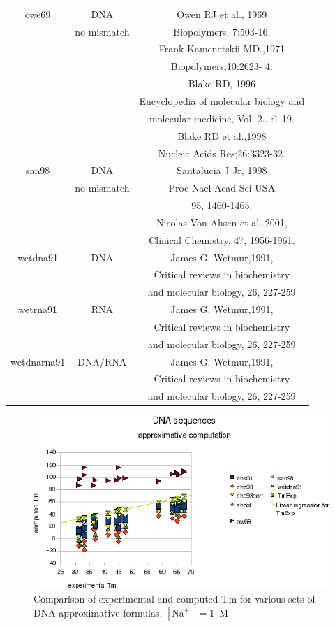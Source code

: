 \documentclass{article}
\begin{document}
\begin{table}[hc]
\begin{tabular}[h]{| c | c | c |}
 \hline
owe69 & DNA & Owen RJ et al., 1969\\
 & no mismatch & Biopolymers, 7:503-16. \\
 & & Frank-Kamenetskii MD.,1971 \\
 & & Biopolymers;10:2623- 4. \\
 & & Blake RD, 1996\\
 & & Encyclopedia of molecular biology and \\
 & & molecular medicine, Vol. 2., :1-19. \\
 & & Blake RD et al.,1998\\
 & & Nucleic Acids Res;26:3323-32. \\
 \hline
san98 & DNA & Santalucia J Jr, 1998\\
 & no mismatch & Proc Nacl Acad Sci USA \\
 & & 95, 1460-1465. \\
 & & Nicolas Von Ahsen et al. 2001, \\
 & & Clinical Chemistry, 47, 1956-1961. \\
 \hline
wetdna91 & DNA & James G. Wetmur,1991, \\
 & & Critical reviews in biochemistry \\
 & & and molecular biology, 26, 227-259 \\
 \hline
wetrna91 & RNA & James G. Wetmur,1991, \\
 & & Critical reviews in biochemistry \\
 & & and molecular biology, 26, 227-259 \\
 \hline
wetdnarna91 & DNA/RNA & James G. Wetmur,1991, \\
 & & Critical reviews in biochemistry \\
 & & and molecular biology, 26, 227-259 \\
 \hline
\end{tabular}
\end{table}
 
\begin{figure}[h]
\includegraphics[width=1\linewidth]{images/DNAApproximativeMode}
\caption{Comparison of experimental and computed Tm for various sets of
 DNA approximative formulas. $[\mbox{Na}^+] = 1$~M}
\end{figure}   
\end{document}
